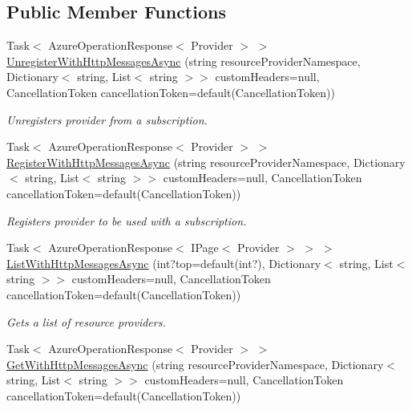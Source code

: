 \subsection*{Public Member Functions}
\begin{DoxyCompactItemize}
\item 
Task$<$ Azure\+Operation\+Response$<$ Provider $>$ $>$ \hyperlink{interface_microsoft_1_1_azure_1_1_management_1_1_resources_1_1_i_providers_operations_ab7de56500b4ae60a2a6ed4b56dc1ac31}{Unregister\+With\+Http\+Messages\+Async} (string resource\+Provider\+Namespace, Dictionary$<$ string, List$<$ string $>$$>$ custom\+Headers=null, Cancellation\+Token cancellation\+Token=default(Cancellation\+Token))
\begin{DoxyCompactList}\small\item\em Unregisters provider from a subscription. \end{DoxyCompactList}\item 
Task$<$ Azure\+Operation\+Response$<$ Provider $>$ $>$ \hyperlink{interface_microsoft_1_1_azure_1_1_management_1_1_resources_1_1_i_providers_operations_af588bfe1c7ca37fd49af4ccca5402fd3}{Register\+With\+Http\+Messages\+Async} (string resource\+Provider\+Namespace, Dictionary$<$ string, List$<$ string $>$$>$ custom\+Headers=null, Cancellation\+Token cancellation\+Token=default(Cancellation\+Token))
\begin{DoxyCompactList}\small\item\em Registers provider to be used with a subscription. \end{DoxyCompactList}\item 
Task$<$ Azure\+Operation\+Response$<$ I\+Page$<$ Provider $>$ $>$ $>$ \hyperlink{interface_microsoft_1_1_azure_1_1_management_1_1_resources_1_1_i_providers_operations_a3be9ced66fb36106517c3a9656445576}{List\+With\+Http\+Messages\+Async} (int?top=default(int?), Dictionary$<$ string, List$<$ string $>$$>$ custom\+Headers=null, Cancellation\+Token cancellation\+Token=default(Cancellation\+Token))
\begin{DoxyCompactList}\small\item\em Gets a list of resource providers. \end{DoxyCompactList}\item 
Task$<$ Azure\+Operation\+Response$<$ Provider $>$ $>$ \hyperlink{interface_microsoft_1_1_azure_1_1_management_1_1_resources_1_1_i_providers_operations_ad2484f97ac566bf81811bbc36f1de564}{Get\+With\+Http\+Messages\+Async} (string resource\+Provider\+Namespace, Dictionary$<$ string, List$<$ string $>$$>$ custom\+Headers=null, Cancellation\+Token cancellation\+Token=default(Cancellation\+Token))

\end{DoxyCompactItemize}
